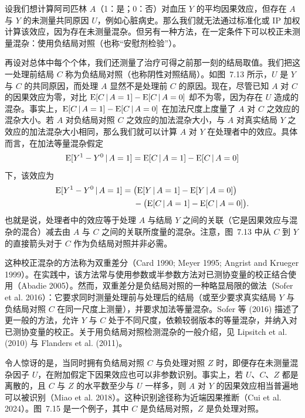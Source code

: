 \begin{techpoint}[双重差分与负结局对照]
设我们想计算阿司匹林 $A$（1：是；0：否）对血压 $Y$ 的平均因果效应，但存在 $A$ 与 $Y$ 的未测量共同原因 $U$，例如心脏病史。那么我们就无法通过标准化或 IP 加权计算该效应，因为存在未测量混杂。但另有一种方法，在一定条件下可以校正未测量混杂：使用负结局对照（也称“安慰剂检验”）。

再设对总体中每个个体，我们还测量了治疗可得之前那一刻的结局取值。我们把这一处理前结局 $C$ 称为负结局对照（也称阴性对照结局）。如图~7.13 所示，$U$ 是 $Y$ 与 $C$ 的共同原因，而处理 $A$ 显然不是处理前 $C$ 的原因。现在，尽管已知 $A$ 对 $C$ 的因果效应为零，对比 $\mathrm{E}[C\,|\, A=1]-\mathrm{E}[C\,|\, A=0]$ 却不为零，因为存在 $U$ 造成的混杂。事实上，$\mathrm{E}[C\,|\, A=1]-\mathrm{E}[C\,|\, A=0]$ 在加法尺度上度量了 $A$ 对 $C$ 之效应的混杂大小。若 $A$ 对负结局对照 $C$ 之效应的加法混杂大小，与 $A$ 对真实结局 $Y$ 之效应的加法混杂大小相同，那么我们就可以计算 $A$ 对 $Y$ 在处理者中的效应。具体而言，在加法等量混杂假定
\[
\mathrm{E}[Y^{1}-Y^{0}\,|\, A=1]=\mathrm{E}[C\,|\, A=1]-\mathrm{E}[C\,|\, A=0]
\]
下，该效应为
\[
\begin{aligned}
\mathrm{E}[Y^{1}-Y^{0}\,|\, A=1]={}&\bigl(\mathrm{E}[Y\,|\, A=1]-\mathrm{E}[Y\,|\, A=0]\bigr)\\
&-\bigl(\mathrm{E}[C\,|\, A=1]-\mathrm{E}[C\,|\, A=0]\bigr).
\end{aligned}
\]
也就是说，处理者中的效应等于处理 $A$ 与结局 $Y$ 之间的关联（它是因果效应与混杂的混合）减去由 $A$ 与 $C$ 之间的关联所度量的混杂。注意，图~7.13 中从 $C$ 到 $Y$ 的直接箭头对于 $C$ 作为负结局对照并非必需。

这种校正混杂的方法称为双重差分（Card 1990; Meyer 1995; Angrist and Krueger 1999）。在实践中，该方法常与使用参数或半参数方法对已测协变量的校正结合使用（Abadie 2005）。然而，双重差分是负结局对照的一种略显局限的做法（Sofer et al. 2016）：它要求同时测量处理前与处理后的结局（或至少要求真实结局 $Y$ 与负结局对照 $C$ 在同一尺度上测量），并要求加法等量混杂。Sofer 等 (2016) 描述了更一般的方法，允许 $Y$ 与 $C$ 处于不同尺度，依赖较弱版本的等量混杂，并纳入对已测协变量的校正。关于用负结局对照检测混杂的一般介绍，见 Lipsitch et al. (2010) 与 Flanders et al. (2011)。

令人惊讶的是，当同时拥有负结局对照 $C$ 与负处理对照 $Z$ 时，即便存在未测量混杂因子 $U$，在附加假定下因果效应也可以非参数识别。事实上，若 $U$、$C$、$Z$ 都是离散的，且 $C$ 与 $Z$ 的水平数至少与 $U$ 一样多，则 $A$ 对 $Y$ 的因果效应相当普遍地可以被识别（Miao et al. 2018）。这种识别途径称为近端因果推断（Cui et al. 2024）。图~7.15 是一个例子，其中 $C$ 是负结局对照，$Z$ 是负处理对照。
\end{techpoint}


